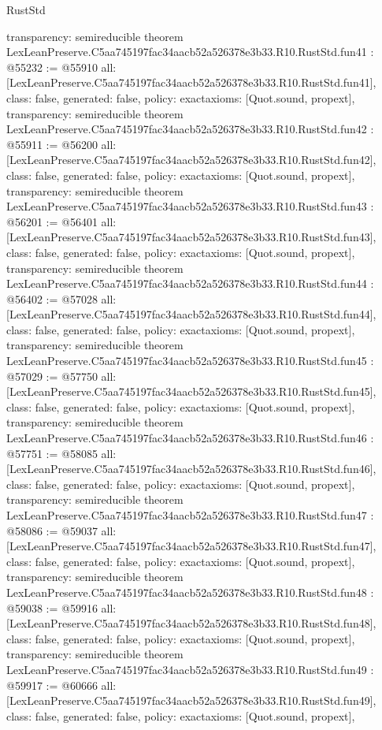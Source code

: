 \begin{lexlean}{RustStd}
\begin{coremodule}
{  transparency: semireducible
}
theorem LexLeanPreserve.C5aa745197fac34aacb52a526378e3b33.R10.RustStd.fun41 : @55232 := @55910 {
  all: [LexLeanPreserve.C5aa745197fac34aacb52a526378e3b33.R10.RustStd.fun41],
  class: false,
  generated: false,
  policy: exact{axioms: [Quot.sound, propext]},
  transparency: semireducible
}
theorem LexLeanPreserve.C5aa745197fac34aacb52a526378e3b33.R10.RustStd.fun42 : @55911 := @56200 {
  all: [LexLeanPreserve.C5aa745197fac34aacb52a526378e3b33.R10.RustStd.fun42],
  class: false,
  generated: false,
  policy: exact{axioms: [Quot.sound, propext]},
  transparency: semireducible
}
theorem LexLeanPreserve.C5aa745197fac34aacb52a526378e3b33.R10.RustStd.fun43 : @56201 := @56401 {
  all: [LexLeanPreserve.C5aa745197fac34aacb52a526378e3b33.R10.RustStd.fun43],
  class: false,
  generated: false,
  policy: exact{axioms: [Quot.sound, propext]},
  transparency: semireducible
}
theorem LexLeanPreserve.C5aa745197fac34aacb52a526378e3b33.R10.RustStd.fun44 : @56402 := @57028 {
  all: [LexLeanPreserve.C5aa745197fac34aacb52a526378e3b33.R10.RustStd.fun44],
  class: false,
  generated: false,
  policy: exact{axioms: [Quot.sound, propext]},
  transparency: semireducible
}
theorem LexLeanPreserve.C5aa745197fac34aacb52a526378e3b33.R10.RustStd.fun45 : @57029 := @57750 {
  all: [LexLeanPreserve.C5aa745197fac34aacb52a526378e3b33.R10.RustStd.fun45],
  class: false,
  generated: false,
  policy: exact{axioms: [Quot.sound, propext]},
  transparency: semireducible
}
theorem LexLeanPreserve.C5aa745197fac34aacb52a526378e3b33.R10.RustStd.fun46 : @57751 := @58085 {
  all: [LexLeanPreserve.C5aa745197fac34aacb52a526378e3b33.R10.RustStd.fun46],
  class: false,
  generated: false,
  policy: exact{axioms: [Quot.sound, propext]},
  transparency: semireducible
}
theorem LexLeanPreserve.C5aa745197fac34aacb52a526378e3b33.R10.RustStd.fun47 : @58086 := @59037 {
  all: [LexLeanPreserve.C5aa745197fac34aacb52a526378e3b33.R10.RustStd.fun47],
  class: false,
  generated: false,
  policy: exact{axioms: [Quot.sound, propext]},
  transparency: semireducible
}
theorem LexLeanPreserve.C5aa745197fac34aacb52a526378e3b33.R10.RustStd.fun48 : @59038 := @59916 {
  all: [LexLeanPreserve.C5aa745197fac34aacb52a526378e3b33.R10.RustStd.fun48],
  class: false,
  generated: false,
  policy: exact{axioms: [Quot.sound, propext]},
  transparency: semireducible
}
theorem LexLeanPreserve.C5aa745197fac34aacb52a526378e3b33.R10.RustStd.fun49 : @59917 := @60666 {
  all: [LexLeanPreserve.C5aa745197fac34aacb52a526378e3b33.R10.RustStd.fun49],
  class: false,
  generated: false,
  policy: exact{axioms: [Quot.sound, propext]},
}
\end{coremodule}
\end{lexlean}
